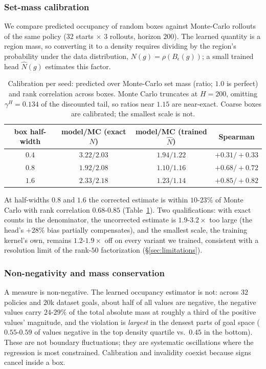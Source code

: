 \documentclass{article}
\newcommand{\Nhat}{\hat N}
\begin{document}
\subsubsection{Set-mass calibration}
\label{sec:set-calibration}

We compare predicted occupancy of random boxes against Monte-Carlo rollouts of the same policy ($32$ starts $\times$ $3$ rollouts, horizon $200$).
The learned quantity is a region mass, so converting it to a density requires dividing by the region's probability under the data distribution, $N(g)=\rho(B_\epsilon(g))$; a small trained head $\Nhat(g)$ estimates this factor.

\begin{table}[t]
\centering\small
\begin{tabular}{c c c c}
\toprule
box half-width & model/MC (exact $N$) & model/MC (trained $\Nhat$) & Spearman \\
\midrule
$0.4$ & $3.22/2.03$ & $1.94/1.22$ & $+0.31/+0.33$ \\
$0.8$ & $1.92/2.08$ & $\mathbf{1.10/1.16}$ & $+0.68/+0.72$ \\
$1.6$ & $2.33/2.18$ & $\mathbf{1.23/1.14}$ & $+0.85/+0.82$ \\
\bottomrule
\end{tabular}
\caption{Calibration per seed: predicted over Monte-Carlo set mass (ratio; $1.0$ is perfect) and rank correlation across boxes.
Monte Carlo truncates at $H{=}200$, omitting $\gamma^{H}=0.134$ of the discounted tail, so ratios near $1.15$ are near-exact.
Coarse boxes are calibrated; the smallest scale is not.}
\label{tab:calib}
\end{table}

At half-widths $0.8$ and $1.6$ the corrected estimate is within $10$-$23\%$ of Monte Carlo with rank correlation $0.68$-$0.85$ (Table~\ref{tab:calib}).
Two qualifications: with exact counts in the denominator, the uncorrected estimate is $1.9$-$3.2\times$ too large (the head's $+28\%$ bias partially compensates), and the smallest scale, the training kernel's own, remains $1.2$-$1.9\times$ off on every variant we trained, consistent with a resolution limit of the rank-$50$ factorization (\S\ref{sec:limitations}).

\subsubsection{Non-negativity and mass conservation}
\label{sec:nonneg}

A measure is non-negative.
The learned occupancy estimator is not: across $32$ policies and $20$k dataset goals, about half of all values are negative, the negative values carry $24$-$29\%$ of the total absolute mass at roughly a third of the positive values' magnitude, and the violation is \emph{largest} in the densest parts of goal space ($0.55$-$0.59$ of values negative in the top density quartile vs.\ $0.45$ in the bottom).
These are not boundary fluctuations; they are systematic oscillations where the regression is most constrained.
Calibration and invalidity coexist because signs cancel inside a box.
\end{document}
